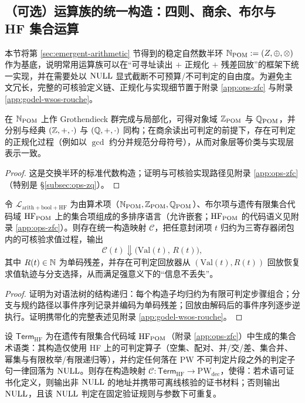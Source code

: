 \subsection{（可选）运算族的统一构造：四则、商余、布尔与 HF 集合运算}\label{subsec:cc-unified-ops}

本节将第 \ref{sec:emergent-arithmetic} 节得到的稳定自然数半环 $\mathbb{N}_{\mathrm{POM}}:=(Z,\oplus,\otimes)$ 作为基底，说明常用运算族可以在“可寻址读出 $+$ 正规化 $+$ 残差回放”的框架下统一实现，并在需要处以 $\mathrm{NULL}$ 显式截断不可预算/不可判定的自由度。为避免主文冗长，完整的可核验定义链、正规化与实现细节置于附录 \ref{app:ops-zfc} 与附录 \ref{app:godel-wsos-rouche}。

\begin{proposition}\label{prop:cc-zq-summary}
在 $\mathbb{N}_{\mathrm{POM}}$ 上作 Grothendieck 群完成与局部化，可得对象域 $\mathbb{Z}_{\mathrm{POM}}$ 与 $\mathbb{Q}_{\mathrm{POM}}$，并分别与经典 $(\mathbb{Z},+,\cdot)$ 与 $(\mathbb{Q},+,\cdot)$ 同构；在商余读出可判定的前提下，存在可判定的正规化过程（例如以 $\gcd$ 约分并规范分母符号），从而对象层等价类与实现层表示一致。
\end{proposition}

\begin{proof}
这是交换半环的标准代数构造；证明与可核验实现路径见附录 \ref{app:ops-zfc}（特别是 \S\ref{subsec:ops-zq}）。
\end{proof}

\begin{theorem}[全语言可逆求值的统一实现（概要）]\label{thm:cc-unified-reversible-compiler}
令 $\mathcal{L}_{\mathrm{arith+bool+HF}}$ 为由算术项（$\mathbb{N}_{\mathrm{POM}},\mathbb{Z}_{\mathrm{POM}},\mathbb{Q}_{\mathrm{POM}}$）、布尔项与遗传有限集合代码域 $\mathrm{HF}_{\mathrm{POM}}$ 上的集合项组成的多排序语言（允许嵌套；$\mathrm{HF}_{\mathrm{POM}}$ 的代码语义见附录 \ref{app:ops-zfc}）。则存在统一构造映射 $\mathcal{C}$，把任意封闭项 $t$ 归约为三寄存器闭包内的可核验求值过程，输出
$$
\mathcal{C}(t)\Downarrow \bigl(\mathrm{Val}(t),\,R(t)\bigr),
$$
其中 $R(t)\in\mathbb{N}$ 为单码残差，并存在可判定回放器从 $(\mathrm{Val}(t),R(t))$ 回放恢复求值轨迹与分支选择，从而满足强意义下的“信息不丢失”。
\end{theorem}

\begin{proof}
证明为对语法树的结构递归：每个构造子均归约为有限可判定步骤组合；分支与规约路径以事件序列记录并编码为单码残差；回放由解码后的事件序列逐步逆执行。证明携带化的完整表述见附录 \ref{app:godel-wsos-rouche}。
\end{proof}

\begin{theorem}\label{thm:cc-zfc-term-null-closure}
设 $\mathsf{Term}_{\mathrm{HF}}$ 为在遗传有限集合代码域 $\mathrm{HF}_{\mathrm{POM}}$（附录 \ref{app:ops-zfc}）中生成的集合术语类：其构造仅使用 HF 上的可判定算子（空集、配对、并/交/差、集合并、幂集与有限枚举/有限递归等），并约定任何落在 PW 不可判定片段之外的判定子句一律回落为 $\mathrm{NULL}$。则存在构造映射 $\mathcal{C}:\mathsf{Term}_{\mathrm{HF}}\to \mathrm{PW}_{\mathrm{dec}}$，使得：若术语可证书化定义，则输出非 $\mathrm{NULL}$ 的地址并携带可离线核验的证书材料；否则输出 $\mathrm{NULL}$，且该 $\mathrm{NULL}$ 判定在固定验证规则与参数下可重复。
\end{theorem}

